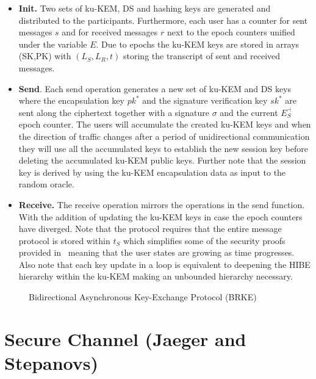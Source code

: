 \documentclass[11pt,a4paper,twoside,openright,bibliography=totoc]{scrbook}
\begin{document}
\begin{itemize}
\item \textbf{Init.} Two sets of ku-KEM, DS and hashing keys are generated
  and distributed to the participants. Furthermore, each user has a counter
  for sent messages $s$ and for received messages $r$ next to the epoch
  counters unified under the variable $E$. Due to epochs the ku-KEM keys
  are stored in arrays (SK,PK) with $(L_S,L_R,t)$ storing the transcript
  of sent and received messages.
\item \textbf{Send}. Each send operation generates a new set of
  ku-KEM and DS keys where the encapsulation key $pk^*$ and the
  signature verification key $sk^*$ are sent along the ciphertext
  together with a signature $\sigma$ and the current $E_S^\dashv$ epoch
  counter. The users will
  accumulate the created ku-KEM keys and when the direction
  of traffic changes after a period of unidirectional communication
  they will use all the accumulated keys to establish the new
  session key before deleting the accumulated ku-KEM public keys.
  Further note that the
  session key is derived by using the ku-KEM encapsulation data
  as input to the random oracle.
\item \textbf{Receive.} The receive operation mirrors the
  operations in the send function. With the addition
  of updating the ku-KEM keys in case the epoch counters have diverged.
  Note that the protocol requires that the entire message protocol
  is stored within $t_S$ which simplifies some of the security
  proofs provided in~\cite{poettering2018towards} meaning that
  the user states are growing as time progresses. Also note
  that each key update in a loop is equivalent to deepening
  the HIBE hierarchy within the ku-KEM making an unbounded
  hierarchy necessary.
\end{itemize}

\begin{figure}[p]
  \centering
  \setlength{\fboxsep}{10pt}
  \scalebox{0.9}{%
    \fbox{%
      
    }
  }
  \caption{Bidirectional Asynchronous Key-Exchange Protocol (BRKE)}
  \label{fig:brke}
\end{figure}

\clearpage

\section[Secure Channel (Jaeger and Stepanovs)]
{Secure Channel (Jaeger and Stepanovs)~\cite{jaeger2018optimal}}
\label{sec:jaeger-stepanovs}
\end{document}
